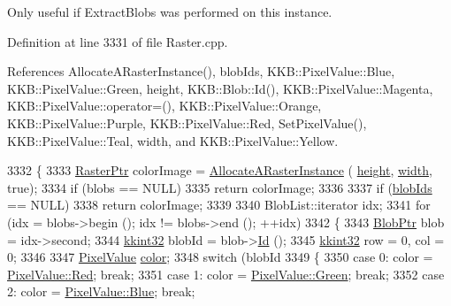 Only useful if \textquotesingle{}Extract\+Blobs\textquotesingle{} was performed on this instance. 

Definition at line 3331 of file Raster.\+cpp.



References Allocate\+A\+Raster\+Instance(), blob\+Ids, K\+K\+B\+::\+Pixel\+Value\+::\+Blue, K\+K\+B\+::\+Pixel\+Value\+::\+Green, height, K\+K\+B\+::\+Blob\+::\+Id(), K\+K\+B\+::\+Pixel\+Value\+::\+Magenta, K\+K\+B\+::\+Pixel\+Value\+::operator=(), K\+K\+B\+::\+Pixel\+Value\+::\+Orange, K\+K\+B\+::\+Pixel\+Value\+::\+Purple, K\+K\+B\+::\+Pixel\+Value\+::\+Red, Set\+Pixel\+Value(), K\+K\+B\+::\+Pixel\+Value\+::\+Teal, width, and K\+K\+B\+::\+Pixel\+Value\+::\+Yellow.


\begin{DoxyCode}
3332 \{
3333   \hyperlink{class_k_k_b_1_1_raster}{RasterPtr}  colorImage = \hyperlink{class_k_k_b_1_1_raster_aa879980d112c01cb7ad9a3cfc7cd6f64}{AllocateARasterInstance} (
      \hyperlink{class_k_k_b_1_1_raster_af39ff189de4fbb6de98392e187efafb7}{height}, \hyperlink{class_k_k_b_1_1_raster_ae0bcc103e191c3421d7692dc69ceb554}{width}, \textcolor{keyword}{true});
3334   \textcolor{keywordflow}{if}  (blobs == NULL)
3335     \textcolor{keywordflow}{return} colorImage;
3336 
3337   \textcolor{keywordflow}{if}  (\hyperlink{class_k_k_b_1_1_raster_a0fc9a1588e809db0b701f0a886bfd18c}{blobIds} == NULL)
3338     \textcolor{keywordflow}{return} colorImage;
3339 
3340   BlobList::iterator  idx;
3341   \textcolor{keywordflow}{for}  (idx = blobs->begin ();  idx != blobs->end ();  ++idx)
3342   \{
3343     \hyperlink{class_k_k_b_1_1_blob}{BlobPtr}  blob = idx->second;
3344     \hyperlink{namespace_k_k_b_a8fa4952cc84fda1de4bec1fbdd8d5b1b}{kkint32}  blobId = blob->\hyperlink{class_k_k_b_1_1_blob_add1ed75f6509956508b71aabeeae213c}{Id} ();
3345     \hyperlink{namespace_k_k_b_a8fa4952cc84fda1de4bec1fbdd8d5b1b}{kkint32}  row = 0, col = 0;
3346 
3347     \hyperlink{class_k_k_b_1_1_pixel_value}{PixelValue}  \hyperlink{class_k_k_b_1_1_raster_a482384d89cc53fa4f36276307c746854}{color};
3348     \textcolor{keywordflow}{switch}  (blobId %
3349     \{
3350     \textcolor{keywordflow}{case}  0:  color = \hyperlink{class_k_k_b_1_1_pixel_value_a9d2c067be56aec7c69d00ec701020fca}{PixelValue::Red};      \textcolor{keywordflow}{break};
3351     \textcolor{keywordflow}{case}  1:  color = \hyperlink{class_k_k_b_1_1_pixel_value_a151caa1579d95170de6eccdd0947bf58}{PixelValue::Green};    \textcolor{keywordflow}{break};
3352     \textcolor{keywordflow}{case}  2:  color = \hyperlink{class_k_k_b_1_1_pixel_value_a95467b558e03495bcedbbcb3b000cfd2}{PixelValue::Blue};     \textcolor{keywordflow}{break};

\end{DoxyCode}
